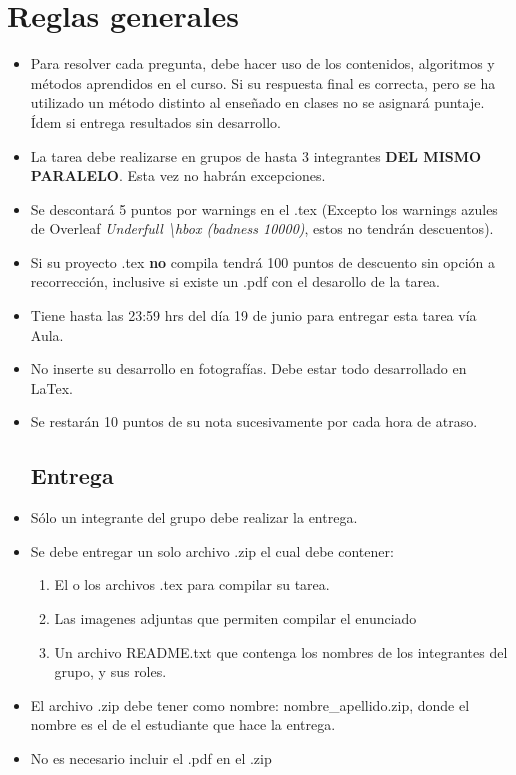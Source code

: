 \documentclass[letterpaper,10pt]{article}
\begin{document}
\section{Reglas generales}
\begin{itemize}
    
    \item Para resolver cada pregunta, debe hacer uso de los contenidos, algoritmos y métodos aprendidos en el curso. Si su respuesta final es correcta, pero se ha utilizado un método distinto al enseñado en clases no se asignará puntaje. Ídem si entrega resultados sin desarrollo.
    
    \item La tarea debe realizarse en grupos de hasta 3 integrantes \textbf{\large DEL MISMO PARALELO}. Esta vez no habrán excepciones.
    
    \item Se descontará 5 puntos por warnings en el .tex (Excepto los warnings azules de Overleaf \textit{Underfull \textbackslash hbox (badness 10000)}, estos no tendrán descuentos).
    
    \item Si su proyecto .tex \textbf{no} compila tendrá 100 puntos de descuento sin opción a recorrección, inclusive si existe un .pdf con el desarollo de la tarea.
        
    \item Tiene hasta las 23:59 hrs del día 19 de junio para entregar esta tarea vía Aula.
    
    \item No inserte su desarrollo en fotografías. Debe estar todo desarrollado en LaTex.
    
    \item Se restarán 10 puntos de su nota sucesivamente por cada hora de atraso.
    
    \subsection{Entrega}
     \item Sólo un integrante del grupo debe realizar la entrega.
     
     \item Se debe entregar un solo archivo .zip el cual debe contener:
     \begin{enumerate}
         \item El o los archivos .tex para compilar su tarea.
         \item Las imagenes adjuntas que permiten compilar el enunciado
         \item Un archivo README.txt que contenga los nombres de los integrantes del grupo, y sus roles.
     \end{enumerate}
     \item El archivo .zip debe tener como nombre: nombre\_apellido.zip, donde el nombre es el de el estudiante que hace la entrega.
     \item No es necesario incluir el .pdf en el .zip

    
\end{itemize}
\newpage
\end{document}
